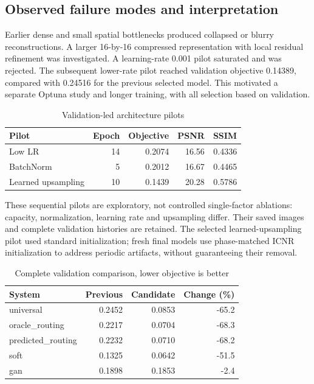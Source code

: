 \documentclass[conference]{IEEEtran}
\begin{document}
\subsection{Observed failure modes and interpretation}

Earlier dense and small spatial bottlenecks produced collapsed or blurry reconstructions. A larger 16-by-16 compressed representation with local residual refinement was investigated. A learning-rate 0.001 pilot saturated and was rejected. The subsequent lower-rate pilot reached validation objective 0.14389, compared with 0.24516 for the previous selected model. This motivated a separate Optuna study and longer training, with all selection based on validation.

\begin{table}[!ht]\centering\caption{Validation-led architecture pilots}\scriptsize\begin{tabular}{lrrrr}\toprule Pilot & Epoch & Objective & PSNR & SSIM\\\midrule

Low LR & 14 & 0.2074 & 16.56 & 0.4336\\

BatchNorm & 5 & 0.2012 & 16.67 & 0.4465\\

Learned upsampling & 10 & 0.1439 & 20.28 & 0.5786\\

\bottomrule\end{tabular}\end{table}

These sequential pilots are exploratory, not controlled single-factor ablations: capacity, normalization, learning rate and upsampling differ. Their saved images and complete validation histories are retained. The selected learned-upsampling pilot used standard initialization; fresh final models use phase-matched ICNR initialization to address periodic artifacts, without guaranteeing their removal.

\begin{table}[!ht]\centering\caption{Complete validation comparison, lower objective is better}\scriptsize\begin{tabular}{lrrr}\toprule System & Previous & Candidate & Change (\%)\\\midrule

universal & 0.2452 & 0.0853 & -65.2\\

oracle\_routing & 0.2217 & 0.0704 & -68.3\\

predicted\_routing & 0.2232 & 0.0710 & -68.2\\

soft & 0.1325 & 0.0642 & -51.5\\

gan & 0.1898 & 0.1853 & -2.4\\

\bottomrule\end{tabular}\end{table}
\end{document}
